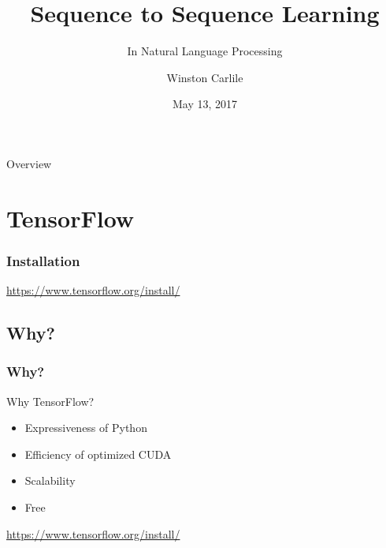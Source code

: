 \documentclass[pdf]{beamer}
\title{Sequence to Sequence Learning}
\subtitle{In Natural Language Processing}
\date{May 13, 2017}
\author{Winston Carlile}
\begin{document}
\begin{frame}
  \titlepage
\end{frame}

\begin{frame}{Overview}
  \tableofcontents
\end{frame}
\section{TensorFlow}

\begin{frame}
  \frametitle{Installation}
  \url{https://www.tensorflow.org/install/}
\end{frame}

\subsection{Why?}
\begin{frame}
  \frametitle{Why?}
  Why TensorFlow?
  \begin{itemize}
  \item Expressiveness of Python
  \item Efficiency of optimized CUDA
  \item Scalability\pause
  \item Free \smiley
  \end{itemize}
  \pause
  \url{https://www.tensorflow.org/install/}
\end{frame}
\end{document}
